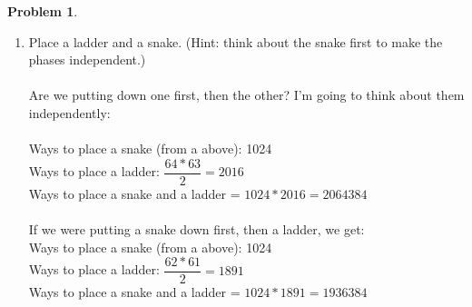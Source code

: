 \documentclass[10pt,leqno ]{article}
\theoremstyle{definition}
\newtheorem{problem}[theorem]{Problem}
\begin{document}
\begin{problem}
\begin{enumerate}[label=(\alph*)]
\newpage
\item Place a ladder and a snake.  (Hint:  think about the snake first to make the phases independent.)
\\\\
Are we putting down one first, then the other?  I'm going to think about them independently:
\\\\
Ways to place a snake (from a above): 1024
\\
Ways to place a ladder: $\dfrac{64 * 63}2{}= 2016$
\\
Ways to place a snake and a ladder = $1024 * 2016 = 2064384$ 
\\\\
If we were putting a snake down first, then a ladder, we get:
\\
Ways to place a snake (from a above): 1024
\\
Ways to place a ladder: $\dfrac{62 * 61}{2} = 1891$
\\
Ways to place a snake and a ladder = $1024 * 1891 = 1936384$ 
\end{enumerate}

\end{problem}
\begin{center}

\end{center}
\end{document}
